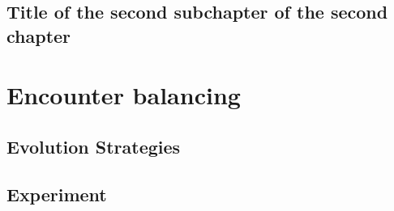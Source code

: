 \section{Title of the second subchapter of the second chapter}


\chapter{Encounter balancing}

\section{Evolution Strategies}



\section{Experiment}

